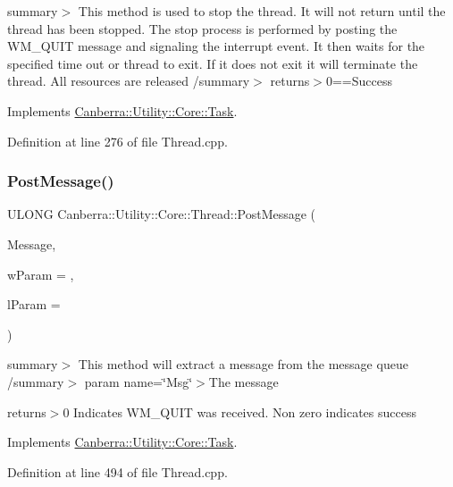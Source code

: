 summary$>$ This method is used to stop the thread. It will not return until the thread has been stopped. The stop process is performed by posting the W\+M\+\_\+\+Q\+U\+IT message and signaling the interrupt event. It then waits for the specified time out or thread to exit. If it does not exit it will terminate the thread. All resources are released /summary$>$ returns$>$0==Success

Implements \hyperlink{class_canberra_1_1_utility_1_1_core_1_1_task}{Canberra\+::\+Utility\+::\+Core\+::\+Task}.



Definition at line 276 of file Thread.\+cpp.

\mbox{\label{class_canberra_1_1_utility_1_1_core_1_1_thread_a6f8e64dbea0a4ac8159a5dc33b9b106b_a6f8e64dbea0a4ac8159a5dc33b9b106b}} 
\subsubsection{\texorpdfstring{Post\+Message()}{PostMessage()}}
{\footnotesize\ttfamily U\+L\+O\+NG Canberra\+::\+Utility\+::\+Core\+::\+Thread\+::\+Post\+Message (\begin{DoxyParamCaption}\item[{U\+I\+NT}]{Message,  }\item[{W\+P\+A\+R\+AM}]{w\+Param = {},  }\item[{L\+P\+A\+R\+AM}]{l\+Param = {} }\end{DoxyParamCaption})\hspace{0.3cm}{\ttfamily [virtual]}}

summary$>$ This method will extract a message from the message queue /summary$>$ param name=\char`\"{}\+Msg\char`\"{}$>$The message

returns$>$0 Indicates W\+M\+\_\+\+Q\+U\+IT was received. Non zero indicates success

Implements \hyperlink{class_canberra_1_1_utility_1_1_core_1_1_task}{Canberra\+::\+Utility\+::\+Core\+::\+Task}.



Definition at line 494 of file Thread.\+cpp.

